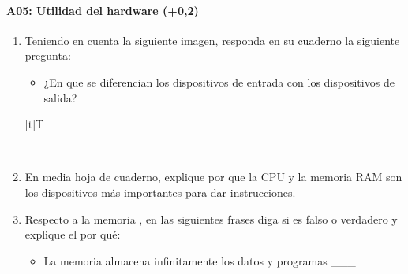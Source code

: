 \documentclass[letterpaper,10pt,spanish]{sphinxmanual}
\let\sphinxpxdimen\pdfpxdimen\else\newdimen\sphinxpxdimen
\begin{document}
\paragraph{A05: Utilidad del hardware (+0,2)}
\label{\detokenize{cursos/ofimatica11/periodo01/G01:a05-utilidad-del-hardware-0-2}}
\sphinxAtStartPar
{}
\begin{enumerate}
%
\item {} 
\sphinxAtStartPar
Teniendo en cuenta la siguiente imagen, responda en su cuaderno la siguiente pregunta:
\begin{itemize}
\item {} 
\sphinxAtStartPar
¿En que se diferencian los dispositivos de entrada con los dispositivos de salida?

\end{itemize}


\begin{savenotes}\sphinxattablestart
\sphinxthistablewithglobalstyle
\centering
\begin{tabulary}{\linewidth}[t]{T}
\sphinxtoprule
\sphinxtableatstartofbodyhook

\begin{sphinxfigure-in-table}
\centering
\capstart
\noindent\sphinxincludegraphics[width=360\sphinxpxdimen]{{image033}.png}
\label{\detokenize{cursos/ofimatica11/periodo01/G01:id3}}\end{sphinxfigure-in-table}\relax
\\
\sphinxbottomrule
\end{tabulary}
\sphinxtableafterendhook\par
\sphinxattableend\end{savenotes}

\item {} 
\sphinxAtStartPar
En media hoja de cuaderno, explique por que la CPU y la memoria RAM son los dispositivos más importantes para dar instrucciones.

\item {} 
\sphinxAtStartPar
Respecto a la memoria , en las siguientes frases diga si es falso o verdadero y explique el por qué:
\begin{itemize}
\item {} 
\sphinxAtStartPar
La memoria  almacena infinitamente los datos y programas \_\_\_


\end{itemize}
\end{enumerate}
\end{document}
